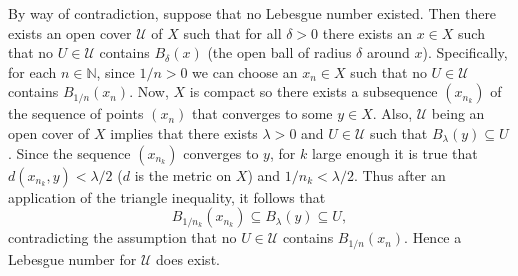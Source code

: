 \documentclass[12pt]{article}
\begin{document}
By way of contradiction, suppose that no Lebesgue number existed. Then there exists an open cover $\mathcal{U}$ of $X$ such that for all $\delta > 0$ there exists an $x \in X$ such that no $U \in \mathcal{U}$ contains $B_\delta(x)$ (the open ball of radius $\delta$ around $x$). Specifically, for each $n \in \mathbb{N}$, since $1/n > 0$ we can choose an $x_n \in X$ such that no $U \in \mathcal{U}$ contains $B_{1/n}(x_n)$. Now, $X$ is compact so there exists a subsequence $(x_{n_k})$ of the sequence of points $(x_n)$ that converges to
some $y \in X$. Also, $\mathcal{U}$ being an open cover of $X$ implies that there exists $\lambda > 0$ and $U \in \mathcal{U}$ such that $B_\lambda(y) \subseteq U$. Since the sequence $(x_{n_k})$ converges to $y$, for $k$ large enough it is true that $d(x_{n_k},y) < \lambda/2$ ($d$ is the metric on $X$) and $1/n_k < \lambda/2$. Thus after an application of the triangle inequality, it follows that
\begin{displaymath}
	B_{1/n_k}(x_{n_k}) \subseteq B_\lambda(y) \subseteq U,
\end{displaymath}
contradicting the assumption that no $U \in \mathcal{U}$ contains $B_{1/n}(x_n)$. Hence a Lebesgue number for $\mathcal{U}$ does exist.
\end{document}
